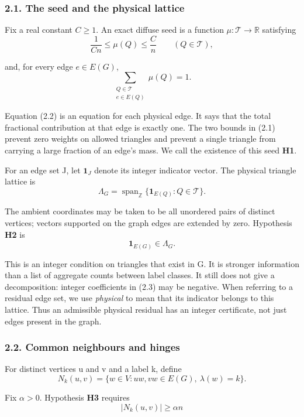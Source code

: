 \documentclass[english,11pt,a4paper]{article}
\begin{document}
\subsubsection{2.1. The seed and the physical lattice}\label{the-seed-and-the-physical-lattice}

Fix a real constant \(C\geq1\). An exact diffuse seed is a function \(\mu:\mathcal T\to\mathbb R\) satisfying
\[\frac{1}{Cn}\leq\mu(Q)\leq\frac{C}{n}
\qquad(Q\in\mathcal T),                                      \tag{2.1}\]

and, for every edge \(e\in E(G)\),
\[\sum_{\substack{Q\in\mathcal T\\e\in E(Q)}}\mu(Q)=1.         \tag{2.2}\]

Equation (2.2) is an equation for each physical edge. It says that the total fractional contribution at that edge is exactly one. The two bounds in (2.1) prevent zero weights on allowed triangles and prevent a single triangle from carrying a large fraction of an edge's mass. We call the existence of this seed \textbf{H1}.

For an edge set J, let \(\mathbf1_J\) denote its integer indicator vector. The physical triangle lattice is
\[\Lambda_G=\operatorname{span}_{\mathbb Z}
\{\mathbf1_{E(Q)}:Q\in\mathcal T\}.                           \tag{2.3}\]

The ambient coordinates may be taken to be all unordered pairs of distinct vertices; vectors supported on the graph edges are extended by zero. Hypothesis \textbf{H2} is
\[\mathbf1_{E(G)}\in\Lambda_G.                                \tag{2.4}\]

This is an integer condition on triangles that exist in G. It is stronger information than a list of aggregate counts between label classes. It still does not give a decomposition: integer coefficients in (2.3) may be negative. When referring to a residual edge set, we use \emph{physical} to mean that its indicator belongs to this lattice. Thus an admissible physical residual has an integer certificate, not just edges present in the graph.

\subsubsection{2.2. Common neighbours and hinges}\label{common-neighbours-and-hinges}

For distinct vertices u and v and a label k, define
\[N_k(u,v)=\{w\in V:uw,vw\in E(G),\ \lambda(w)=k\}.\]

Fix \(\alpha>0\). Hypothesis \textbf{H3} requires
\[|N_k(u,v)|\geq\alpha n                                      \tag{2.5}\]
\end{document}
